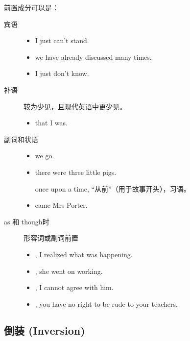 前置成分可以是：
\begin{description}
\item[宾语]
  \begin{itemize}
  \item {} I just can't stand.
  \item {} we have already discussed many times.

  \item  {} I just don't know.
  \end{itemize}
\item[补语] 较为少见，且现代英语中更少见。
  \begin{itemize}
  \item {} that I was.
  \end{itemize}

\item[副词和状语]
  \begin{itemize}
  \item {} we go.

  \item {} there were three little pigs.

    once upon a time, “从前”（用于故事开头），习语。
  \item {} came Mrs Porter.

  \end{itemize}
\item[as 和 though时] 形容词或副词前置
  \begin{itemize}
  \item {}, I realized what was happening.

  \item {}, she went on working.

  \item {}, I cannot agree with him.

  \item {}, you have no right to be rude to your teachers.

  \end{itemize}
\end{description}


\subsection{倒装 (Inversion)}

